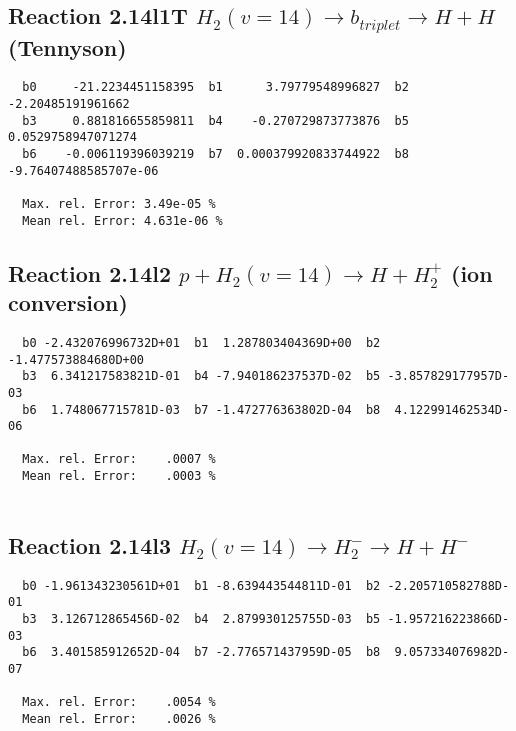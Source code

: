 \documentclass[12pt]{article}
\begin{document}
\subsection{
Reaction 2.14l1T
$  H_2(v=14) \rightarrow b_{triplet}\rightarrow H + H $ (Tennyson)
}


\begin{small}\begin{verbatim}
  b0     -21.2234451158395  b1      3.79779548996827  b2     -2.20485191961662
  b3     0.881816655859811  b4    -0.270729873773876  b5    0.0529758947071274
  b6    -0.006119396039219  b7  0.000379920833744922  b8 -9.76407488585707e-06

  Max. rel. Error: 3.49e-05 %
  Mean rel. Error: 4.631e-06 %
\end{verbatim}\end{small}


\subsection{
Reaction 2.14l2
$ p + H_2(v=14) \rightarrow H + H_2^+$ (ion conversion)
}


\begin{small}\begin{verbatim}
  b0 -2.432076996732D+01  b1  1.287803404369D+00  b2 -1.477573884680D+00
  b3  6.341217583821D-01  b4 -7.940186237537D-02  b5 -3.857829177957D-03
  b6  1.748067715781D-03  b7 -1.472776363802D-04  b8  4.122991462534D-06

  Max. rel. Error:    .0007 %
  Mean rel. Error:    .0003 %


\end{verbatim}\end{small}


\subsection{
Reaction 2.14l3
 $ H_2(v=14) \rightarrow H_2^- \rightarrow H + H^-$
}


\begin{small}\begin{verbatim}
  b0 -1.961343230561D+01  b1 -8.639443544811D-01  b2 -2.205710582788D-01
  b3  3.126712865456D-02  b4  2.879930125755D-03  b5 -1.957216223866D-03
  b6  3.401585912652D-04  b7 -2.776571437959D-05  b8  9.057334076982D-07

  Max. rel. Error:    .0054 %
  Mean rel. Error:    .0026 %


\end{verbatim}\end{small}
\newpage
\end{document}
